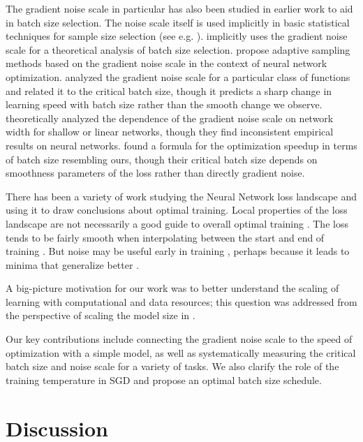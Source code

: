 \documentclass[english]{article}
\begin{document}
The gradient noise scale in particular has also been studied in earlier work to aid in batch size selection.  The noise scale itself is used implicitly in basic statistical techniques for sample size selection (see e.g. \cite{Wiki_noise,NIST_noise}).
\cite{Byrd2012} implicitly uses the gradient noise scale for a theoretical analysis of batch size selection.
\cite{1606.04838,1610.05792,1612.05086} propose adaptive sampling methods based on the gradient noise scale in the context of neural network optimization. %
\cite{1706.05699} analyzed the gradient noise scale for a particular class of functions and related it to the critical batch size, though it predicts a sharp change in learning speed with batch size rather than the smooth change we observe.
\cite{1806.03791} theoretically analyzed the dependence of the gradient noise scale on network width for shallow or linear networks, though they find inconsistent empirical results on neural networks.
\cite{1712.06559} found a formula for the optimization speedup in terms of batch size resembling ours, though their critical batch size depends on smoothness parameters of the loss rather than directly gradient noise.

There has been a variety of work studying the Neural Network loss landscape and using it to draw conclusions about optimal training. Local properties of the loss landscape are not necessarily a good guide to overall optimal training \cite{1803.02021}. The loss tends to be fairly smooth when interpolating between the start and end of training \cite{1412.6544}. But noise may be useful early in training \cite{1511.06807,1706.05699}, perhaps because it leads to minima that generalize better \cite{1609.04836}.

A big-picture motivation for our work was to better understand the scaling of learning with computational and data resources; this question was addressed from the perspective of scaling the model size in \cite{1712.00409}.

Our key contributions include connecting the gradient noise scale to the speed of optimization with a simple model, as well as systematically measuring the critical batch size and noise scale for a variety of tasks.  We also clarify the role of the training temperature in SGD and propose an optimal batch size schedule.

\section{Discussion}
\end{document}
